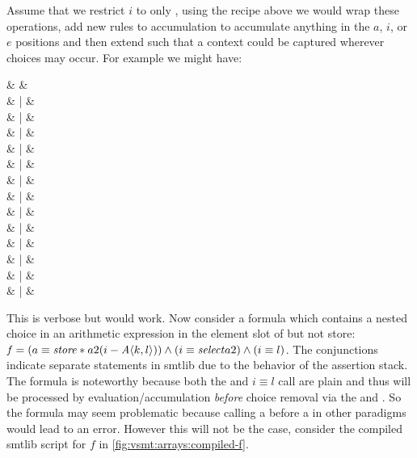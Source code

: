 Assume that we restrict $i$ to only , using the recipe above we would
wrap these operations, add new rules to accumulation to accumulate anything in
the $a$, $i$, or $e$ positions and then extend \zipper{} such that a context
could be captured wherever choices may occur. For example we might have:
%
  \begin{syntax}
    \zipper & \Coloneqq{} & \inRoot  \\[-1.8ex]
    & | & \inNot{\zipper}            \\[-1.8ex]
    & | & \inUnary{\zipper}          \\[-1.8ex]
    & | & \inBoolL{\zipper}{\,\eIL}   \\[-1.8ex]
    & | &        \\[-1.8ex]
    & | & \inArithL{\zipper}{\,\eIL}  \\[-1.8ex]
    & | &       \\[-1.8ex]
    & | & \inInEqL{\zipper}{\,\eIL}   \\[-1.8ex]
    & | &        \\[-1.8ex]
    & | &   \\[-1.8ex]
    & | &   \\[-1.8ex]
    & | &   \\[-1.8ex]
    & | &       \\[-1.8ex]
    & | &  \\
  \end{syntax}
%
  This is verbose but would work. Now consider a formula which contains a nested
  choice in an arithmetic expression in the element slot of \select{} but not
  store: $\kf{f} = (a \equiv \store*{a}{2}{(i - \chc[A]{k,l})}) \wedge (i \equiv
  \select{a}{2}) \wedge (i \equiv l)$. The conjunctions indicate separate
  statements in \acl{smtlib} due to the behavior of the assertion stack. The
  formula is noteworthy because both the \select{} and $i \equiv l$ call are
  plain and thus will be processed by evaluation/accumulation \emph{before}
  choice removal via the \evAndL{} and \evAndR. So the formula may seem
  problematic because calling a \select{} before a \store{} in other paradigms
  would lead to an error. However this will not be the case, consider the
  compiled \acl{smtlib} script for $f$ in \autoref{fig:vsmt:arrays:compiled-f}.
%
